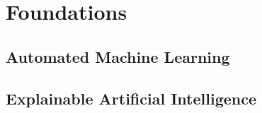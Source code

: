 %
\chapter{Foundations}
\label{sec:found}

\section{Automated Machine Learning}
\label{sec:found:automl}

\section{Explainable Artificial Intelligence}
\label{sec:found:xai}